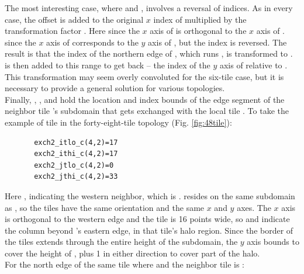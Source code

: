  The most interesting case, where  and
, involves a reversal of indices.  As in every case, the
offset  is added to the original $x$ index of 
multiplied by the transformation factor .  Here
 since the $x$ axis of  is orthogonal
to the $x$ axis of .   since the
$x$ axis of  corresponds to the $y$ axis of , but the
index is reversed.  The result is that the index of the northern edge
of , which runs , is transformed to
.  is then added to this range to
get back  -- the index of the $y$ axis of 
relative to .  This transformation may seem overly convoluted
for the six-tile case, but it is necessary to provide a general
solution for various topologies. \\



Finally, ,
,
 and
 hold the location and index
bounds of the edge segment of the neighbor tile 's subdomain
that gets exchanged with the local tile .  To take the example
of tile  in the forty-eight-tile topology
(Fig. \ref{fig:48tile}): \\

\begin{verbatim}
       exch2_itlo_c(4,2)=17
       exch2_ithi_c(4,2)=17
       exch2_jtlo_c(4,2)=0
       exch2_jthi_c(4,2)=33
\end{verbatim}
 
Here , indicating the western neighbor, which is
.   resides on the same subdomain as , so
the tiles have the same orientation and the same $x$ and $y$ axes.
The $x$ axis is orthogonal to the western edge and the tile is 16
points wide, so  and 
indicate the column beyond 's eastern edge, in that tile's
halo region. Since the border of the tiles extends through the entire
height of the subdomain, the $y$ axis bounds  to
 cover the height of , plus 1 in
either direction to cover part of the halo. \\

For the north edge of the same tile  where  and 
the neighbor tile is :


